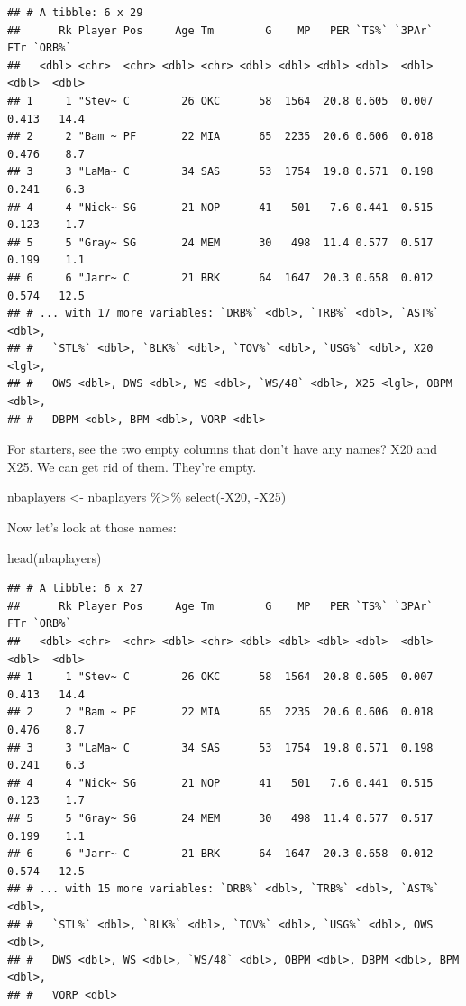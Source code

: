 \documentclass[
]{book}
\newenvironment{Shaded}{\begin{snugshade}}{\end{snugshade}}
\newcommand{\FunctionTok}[1]{\textcolor[rgb]{0.00,0.00,0.00}{#1}}
\newcommand{\NormalTok}[1]{#1}
\newcommand{\OtherTok}[1]{\textcolor[rgb]{0.56,0.35,0.01}{#1}}
\newcommand{\SpecialCharTok}[1]{\textcolor[rgb]{0.00,0.00,0.00}{#1}}
\begin{document}
\begin{verbatim}
## # A tibble: 6 x 29
##      Rk Player Pos     Age Tm        G    MP   PER `TS%` `3PAr`   FTr `ORB%`
##   <dbl> <chr>  <chr> <dbl> <chr> <dbl> <dbl> <dbl> <dbl>  <dbl> <dbl>  <dbl>
## 1     1 "Stev~ C        26 OKC      58  1564  20.8 0.605  0.007 0.413   14.4
## 2     2 "Bam ~ PF       22 MIA      65  2235  20.6 0.606  0.018 0.476    8.7
## 3     3 "LaMa~ C        34 SAS      53  1754  19.8 0.571  0.198 0.241    6.3
## 4     4 "Nick~ SG       21 NOP      41   501   7.6 0.441  0.515 0.123    1.7
## 5     5 "Gray~ SG       24 MEM      30   498  11.4 0.577  0.517 0.199    1.1
## 6     6 "Jarr~ C        21 BRK      64  1647  20.3 0.658  0.012 0.574   12.5
## # ... with 17 more variables: `DRB%` <dbl>, `TRB%` <dbl>, `AST%` <dbl>,
## #   `STL%` <dbl>, `BLK%` <dbl>, `TOV%` <dbl>, `USG%` <dbl>, X20 <lgl>,
## #   OWS <dbl>, DWS <dbl>, WS <dbl>, `WS/48` <dbl>, X25 <lgl>, OBPM <dbl>,
## #   DBPM <dbl>, BPM <dbl>, VORP <dbl>
\end{verbatim}

For starters, see the two empty columns that don't have any names? X20 and X25. We can get rid of them. They're empty.

\begin{Shaded}
\begin{Highlighting}[]
\NormalTok{nbaplayers }\OtherTok{\textless{}{-}}\NormalTok{ nbaplayers }\SpecialCharTok{\%\textgreater{}\%} \FunctionTok{select}\NormalTok{(}\SpecialCharTok{{-}}\NormalTok{X20, }\SpecialCharTok{{-}}\NormalTok{X25)}
\end{Highlighting}
\end{Shaded}

Now let's look at those names:

\begin{Shaded}
\begin{Highlighting}[]
\FunctionTok{head}\NormalTok{(nbaplayers)}
\end{Highlighting}
\end{Shaded}

\begin{verbatim}
## # A tibble: 6 x 27
##      Rk Player Pos     Age Tm        G    MP   PER `TS%` `3PAr`   FTr `ORB%`
##   <dbl> <chr>  <chr> <dbl> <chr> <dbl> <dbl> <dbl> <dbl>  <dbl> <dbl>  <dbl>
## 1     1 "Stev~ C        26 OKC      58  1564  20.8 0.605  0.007 0.413   14.4
## 2     2 "Bam ~ PF       22 MIA      65  2235  20.6 0.606  0.018 0.476    8.7
## 3     3 "LaMa~ C        34 SAS      53  1754  19.8 0.571  0.198 0.241    6.3
## 4     4 "Nick~ SG       21 NOP      41   501   7.6 0.441  0.515 0.123    1.7
## 5     5 "Gray~ SG       24 MEM      30   498  11.4 0.577  0.517 0.199    1.1
## 6     6 "Jarr~ C        21 BRK      64  1647  20.3 0.658  0.012 0.574   12.5
## # ... with 15 more variables: `DRB%` <dbl>, `TRB%` <dbl>, `AST%` <dbl>,
## #   `STL%` <dbl>, `BLK%` <dbl>, `TOV%` <dbl>, `USG%` <dbl>, OWS <dbl>,
## #   DWS <dbl>, WS <dbl>, `WS/48` <dbl>, OBPM <dbl>, DBPM <dbl>, BPM <dbl>,
## #   VORP <dbl>
\end{verbatim}
\end{document}
